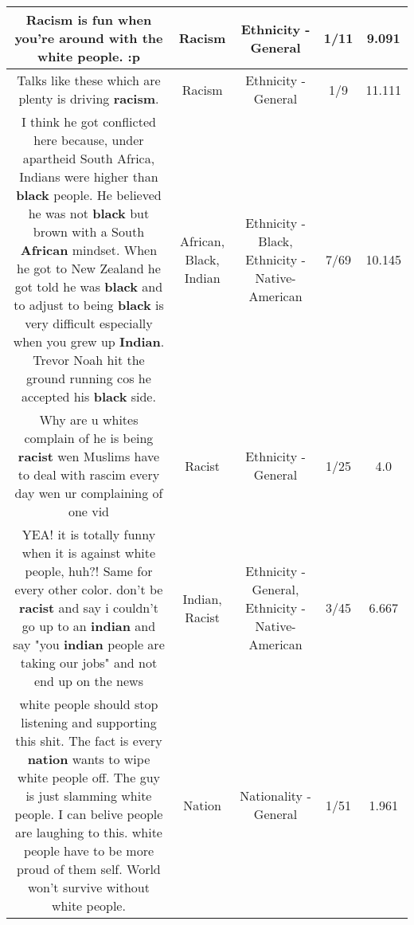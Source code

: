 \documentclass[11pt]{article}
\newlength\mylength
\begin{document}
\begin{center}
\begin{longtable}{|C{.65\mylength}|C{.30\mylength}|C{.12\mylength}|C{.12\mylength}|C{.12\mylength}|}
  \small Racism is fun when you're around with the white people. :p\normalsize   & Racism & Ethnicity - General & 1/11 & 9.091 \\  \hline
  \small Talks like these which are plenty is driving \textbf{racism}.\normalsize   & Racism & Ethnicity - General & 1/9 & 11.111 \\  \hline
  \small I think he got conflicted here because, under apartheid South Africa, Indians were higher than \textbf{black} people. He believed he was not \textbf{black} but brown with a South \textbf{African} mindset. When he got to New Zealand he got told he was \textbf{black} and to adjust to being \textbf{black} is very difficult especially when you grew up \textbf{Indian}. Trevor Noah hit the ground running cos he accepted his \textbf{black} side.\normalsize   & African, Black, Indian & Ethnicity - Black, Ethnicity - Native-American & 7/69 & 10.145 \\  \hline
  \small Why are u whites complain of he is being \textbf{racist} wen Muslims have to deal with rascim every day wen ur complaining of one vid\normalsize   & Racist & Ethnicity - General & 1/25 & 4.0 \\  \hline
  \small YEA! it is totally funny when it is against white people, huh?! Same for every other color. don't be \textbf{racist} and say i couldn't go up to an \textbf{indian} and say "you \textbf{indian} people are taking our jobs" and not end up on the news\normalsize   & Indian, Racist & Ethnicity - General, Ethnicity - Native-American & 3/45 & 6.667 \\  \hline
  \small white people should stop listening and supporting this shit. The fact is every \textbf{nation} wants to wipe white people off. The guy is just slamming white people. I can belive people are laughing to this. white people have to be more proud of them self. World won't survive without white people.\normalsize   & Nation & Nationality - General & 1/51 & 1.961 \\  \hline

\end{longtable}
\end{center}
\end{document}

